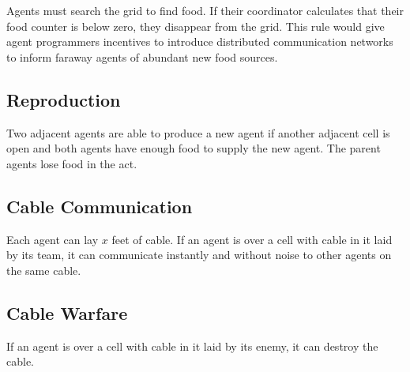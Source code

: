 Agents must search the grid to find food. If their coordinator calculates that their food counter is
below zero, they disappear from the grid. This rule would give agent programmers incentives to
introduce distributed communication networks to inform faraway agents of abundant new food sources.

\subsection{Reproduction}

Two adjacent agents are able to produce a new agent if another adjacent cell is open and both agents
have enough food to supply the new agent. The parent agents lose food in the act.

\subsection{Cable Communication}

Each agent can lay $x$ feet of cable. If an agent is over a cell with cable in it laid by its team,
it can communicate instantly and without noise to other agents on the same cable.

\subsection{Cable Warfare}

If an agent is over a cell with cable in it laid by its enemy, it can destroy the cable.
